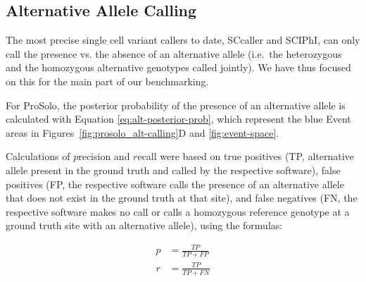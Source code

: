 \documentclass[authoryear,preprint,11pt]{scrartcl}
\begin{document}
\subsection{Alternative Allele Calling}

The most precise single cell variant callers to date, SCcaller and SCIPhI, can only call the presence vs. the absence of an alternative allele (i.e.~the heterozygous and the homozygous alternative genotypes called jointly).
We have thus focused on this for the main part of our benchmarking.

For ProSolo, the posterior probability of the presence of an alternative allele is calculated with Equation \ref{eq:alt-posterior-prob}, which represent the blue Event areas in Figures~\ref{fig:prosolo_alt-calling}D and \ref{fig:event-space}.

Calculations of $p$recision and $r$ecall were based on true positives (TP, alternative allele present in the ground truth and called by the respective software), false positives (FP, the respective software calls the presence of an alternative allele that does not exist in the ground truth at that site), and false negatives (FN, the respective software makes no call or calls a homozygous reference genotype at a ground truth site with an alternative allele), using the formulas:

\begin{equation}
  \label{eq:precp-rec}
  \begin{split}
    p &= \frac{TP}{TP + FP} \\
    r &= \frac{TP}{TP + FN}
  \end{split}
\end{equation}
\end{document}
